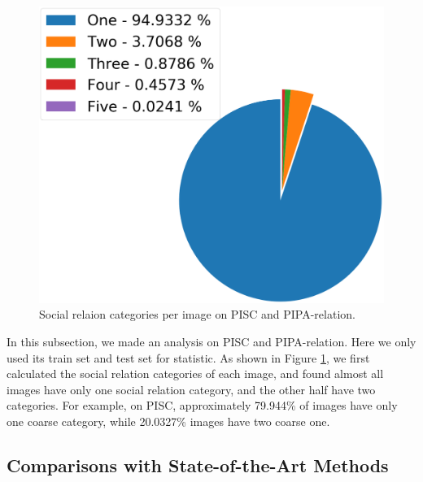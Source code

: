 \documentclass{article}
\begin{document}
\begin{figure}[t]
{    \begin{minipage}[t]{0.45\linewidth}
      \centering
      \includegraphics[width=1\linewidth]{pic/PIPA_fine.png}
    \end{minipage}
  }
  \caption{Social relaion categories per image on PISC and PIPA-relation.}
  \label{fig:dataset_analysis}
\end{figure}


In this subsection, we made an analysis on PISC and PIPA-relation. Here we only used its train set and test set for statistic. As shown in Figure \ref{fig:dataset_analysis}, we first calculated the social relation categories of each image, and found almost all images have only one social relation category, and the other half have two categories. For example, on PISC, approximately 79.944\% of images have only one coarse category, while 20.0327\% images have two coarse one.

\subsection{Comparisons with State-of-the-Art Methods}
\end{document}
